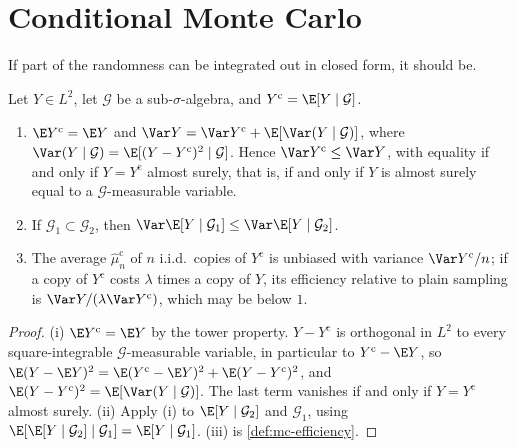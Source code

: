 
\section{Conditional Monte Carlo}\label{sec:st-conditional}

If part of the randomness can be integrated out in closed form, it should be.

\begin{theorem}\label{thm:st-conditional}
Let $Y\in L^2$, let $\mathcal G$ be a sub-$\sigma$-algebra, and $Y^{\mathrm c}=\E[Y\mid\mathcal G]$.
\begin{enumerate}[label=(\roman*)]
  \item $\E Y^{\mathrm c}=\E Y$ and $\Var Y=\Var Y^{\mathrm c}+\E[\Var(Y\mid\mathcal G)]$,
    where $\Var(Y\mid\mathcal G)=\E[(Y-Y^{\mathrm c})^2\mid\mathcal G]$. Hence
    $\Var Y^{\mathrm c}\le\Var Y$, with equality if and only if $Y=Y^{\mathrm c}$ almost
    surely, that is, if and only if $Y$ is almost surely equal to a $\mathcal G$-measurable variable.
  \item If $\mathcal G_1\subset\mathcal G_2$, then
    $\Var\E[Y\mid\mathcal G_1]\le\Var\E[Y\mid\mathcal G_2]$.
  \item The average $\hat\mu^{\mathrm c}_n$ of $n$ i.i.d.\ copies of $Y^{\mathrm c}$ is
    unbiased with variance $\Var Y^{\mathrm c}/n$; if a copy of $Y^{\mathrm c}$ costs $\lambda$
    times a copy of $Y$, its efficiency relative to plain sampling is
    $\Var Y/(\lambda\Var Y^{\mathrm c})$, which may be below $1$.
\end{enumerate}
\end{theorem}

\begin{proof}
(i) $\E Y^{\mathrm c}=\E Y$ by the tower property. $Y-Y^{\mathrm c}$ is orthogonal in $L^2$ to
every square-integrable $\mathcal G$-measurable variable, in particular to
$Y^{\mathrm c}-\E Y$, so
$\E(Y-\E Y)^2=\E(Y^{\mathrm c}-\E Y)^2+\E(Y-Y^{\mathrm c})^2$, and
$\E(Y-Y^{\mathrm c})^2=\E[\Var(Y\mid\mathcal G)]$. The last term vanishes if and only if
$Y=Y^{\mathrm c}$ almost surely. (ii) Apply (i) to $\E[Y\mid\mathcal G_2]$ and $\mathcal G_1$, using
$\E[\E[Y\mid\mathcal G_2]\mid\mathcal G_1]=\E[Y\mid\mathcal G_1]$. (iii) is
\cref{def:mc-efficiency}.
\end{proof}

